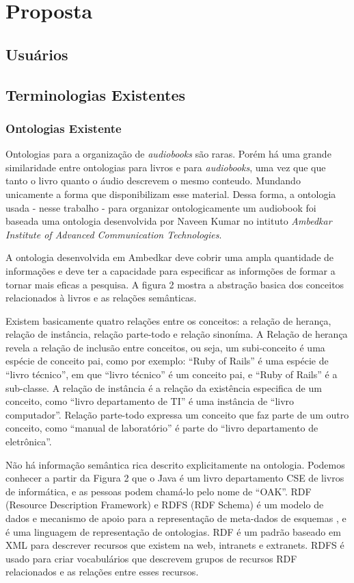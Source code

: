 \chapter{Proposta}\label{cap4}

\section{Usuários}


\section{Terminologias Existentes}

\subsection{Ontologias Existente}
Ontologias para a organização de \textit{audiobooks} são raras. Porém há uma grande similaridade entre ontologias para livros e para \textit{audiobooks}, uma vez que que tanto o livro quanto o áudio descrevem o mesmo conteudo. Mundando unicamente a forma que disponibilizam esse material. Dessa forma, a ontologia usada - nesse trabalho - para organizar ontologicamente um audiobook foi baseada uma ontologia desenvolvida por Naveen Kumar no intituto \textit{Ambedkar Institute of Advanced Communication Technologies}. 

A ontologia desenvolvida em Ambedkar deve cobrir uma ampla quantidade de informações e deve ter a capacidade para especificar as informções de formar a tornar mais eficas a pesquisa\cite{ontologybook}. A figura 2 mostra a abstração basica dos conceitos relacionados à livros e as relações semânticas. 

Existem basicamente quatro relações entre os conceitos: a relação de herança, relação de instância, relação parte-todo e relação sinoníma. A Relação de herança revela a relação de inclusão entre conceitos, ou seja, um subi-conceito é uma espécie de conceito pai, como por exemplo: ``Ruby of Rails'' é uma espécie de ``livro técnico'', em que ``livro técnico'' é um conceito pai, e ``Ruby of Rails'' é a sub-classe. A relação de instância é a relação da existência especifica de um conceito, como ``livro departamento de TI'' é uma instância de ``livro computador''. Relação parte-todo expressa um conceito que faz parte de um outro conceito, como ``manual de laboratório'' é parte do ``livro departamento de eletrônica''.

Não há informação semântica rica descrito explicitamente na ontologia. Podemos conhecer a partir da Figura 2 que o Java é um livro departamento CSE de livros de informática, e as pessoas podem chamá-lo pelo nome de ``OAK''. RDF (Resource Description Framework) e RDFS (RDF Schema) é um modelo de dados e mecanismo de apoio para a representação de meta-dados de esquemas \cite{rdf}, e é uma linguagem de representação de ontologias. RDF é um padrão baseado em XML para descrever recursos que existem na web, intranets e extranets. RDFS é usado para criar vocabulários que descrevem grupos de recursos RDF relacionados e as relações entre esses recursos. 


